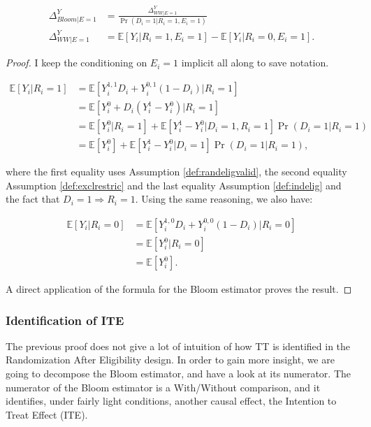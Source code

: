 \documentclass[
]{book}
\newcommand{\esp}[1]{\mathbb{E}[ #1 ]}
\theoremstyle{definition}
\theoremstyle{definition}
\theoremstyle{definition}
\theoremstyle{definition}
\theoremstyle{remark}
\begin{document}
\begin{align*}
  \Delta^Y_{Bloom|E=1} & = \frac{\Delta^Y_{WW|E=1}}{\Pr(D_i=1|R_i=1,E_i=1)} \\
  \Delta^Y_{WW|E=1} & =\esp{Y_i|R_i=1,E_i=1}-\esp{Y_i|R_i=0,E_i=1}.
\end{align*}

\begin{proof}
\iffalse{} {Proof. } \fi{}I keep the conditioning on \(E_i=1\) implicit all along to save notation.

\begin{align*}
  \esp{Y_i|R_i=1} & = \esp{Y_i^{1,1}D_i+Y_i^{0,1}(1-D_i)|R_i=1} \\
                  & = \esp{Y_i^0+D_i(Y_i^1-Y_i^0)|R_i=1} \\
                  & = \esp{Y_i^0|R_i=1}+\esp{Y_i^1-Y_i^0|D_i=1,R_i=1}\Pr(D_i=1|R_i=1)\\
                  & = \esp{Y_i^0}+\esp{Y_i^1-Y_i^0|D_i=1}\Pr(D_i=1|R_i=1),
\end{align*}

where the first equality uses Assumption \ref{def:randeligvalid}, the second equality Assumption \ref{def:exclrestric} and the last equality Assumption \ref{def:indelig} and the fact that \(D_i=1\Rightarrow R_i=1\).
Using the same reasoning, we also have:

\begin{align*}
  \esp{Y_i|R_i=0} & = \esp{Y_i^{1,0}D_i+Y_i^{0,0}(1-D_i)|R_i=0} \\
                  & = \esp{Y_i^0|R_i=0} \\
                  & = \esp{Y_i^0}.
\end{align*}

A direct application of the formula for the Bloom estimator proves the result.
\end{proof}

\hypertarget{identification-of-ite}{%
\subsubsection{Identification of ITE}\label{identification-of-ite}}

The previous proof does not give a lot of intuition of how TT is identified in the Randomization After Eligibility design.
In order to gain more insight, we are going to decompose the Bloom estimator, and have a look at its numerator.
The numerator of the Bloom estimator is a With/Without comparison, and it identifies, under fairly light conditions, another causal effect, the Intention to Treat Effect (ITE).
\end{document}
